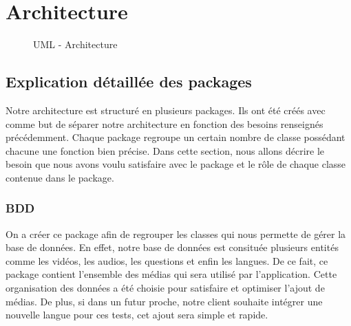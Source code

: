 \chapter{Architecture}
 
\begin{figure}[!h]
\begin{center}
  \caption{UML - Architecture}
  \label{diaglog} 
\end{center}
\end{figure}

\section{Explication détaillée des packages}

Notre architecture est structuré en plusieurs packages. Ils ont été créés avec comme but de séparer notre architecture en fonction des besoins renseignés précédemment. Chaque package regroupe un certain nombre de classe possédant chacune une fonction bien précise. Dans cette section, nous allons décrire le besoin que nous avons voulu satisfaire avec le package et le rôle de chaque classe contenue dans le package.

\subsection{BDD}

On a créer ce package afin de regrouper les classes qui nous permette de gérer la base de données. En effet, notre base de données est consituée plusieurs entités comme les vidéos, les audios, les questions et enfin les langues. De ce fait, ce package contient l'ensemble des médias qui sera utilisé par l'application. Cette organisation des données a été choisie pour satisfaire et optimiser l'ajout de médias. De plus, si dans un futur proche, notre client souhaite intégrer une nouvelle langue pour ces tests, cet ajout sera simple et rapide.

